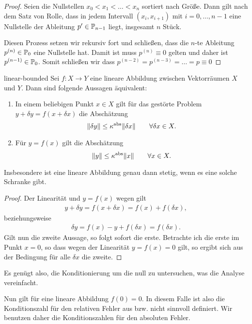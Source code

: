 \begin{proof}
  Seien die Nullstellen $x_0 < x_1 < \dots < x_n$ sortiert nach
  Größe. Dann gilt nach dem Satz von Rolle, dass in jedem Intervall
  $(x_i, x_{i+1})$ mit $i=0,\dots, n-1$ eine Nullstelle der Ableitung
  $p'\in \P_{n-1}$ liegt, insgesamt $n$ Stück.

  Diesen Prozess setzen wir rekursiv fort und schließen, dass die $n$-te
  Ableitung $p^{(n)} \in \P_0$ eine Nullstelle hat. Damit ist muss
  $p^{(n)}\equiv 0$ gelten und daher ist $p^{(n-1)} \in \P_0$. Somit
  schließen wir dass $p^{(n-2)} = p^{(n-3)} = \dots = p \equiv 0$
\end{proof}


\begin{Lemma}{linear-bounded}
  Sei $f\colon X \to Y$ eine lineare Abbildung zwischen Vektorräumen
  $X$ und $Y$. Dann sind folgende Aussagen äquivalent:
  \begin{enumerate}
  \item In einem beliebigen Punkt $x\in X$ gilt für das gestörte Problem
    $y+\delta y = f(x+\delta x)$ die Abschätzung
    \begin{gather}
      \norm{\delta y} \le \kappa^{\text{abs}} \norm{\delta x}
      \qquad\forall \delta x \in X.
    \end{gather}
  \item Für $y = f(x)$ gilt die Abschätzung
    \begin{gather}
      \norm{y} \le \kappa^{\text{abs}} \norm{x}
      \qquad\forall x \in X.
    \end{gather}
  \end{enumerate}
  Insbesondere ist eine lineare Abbildung genau dann stetig, wenn es
  eine solche Schranke gibt.
\end{Lemma}
\begin{proof}
  Der Linearität und $y=f(x)$ wegen gilt
  \begin{gather}
    y + \delta y = f(x+\delta x) = f(x) + f(\delta x),
  \end{gather}
  beziehungsweise
  \begin{gather}
    \delta y = f(x) - y + f(\delta x) = f(\delta x).
  \end{gather}
  Gilt nun die zweite Aussage, so folgt sofort die erste. Betrachte
  ich die erste im Punkt $x=0$, so dass wegen der Linearität
  $y=f(x) = 0$ gilt, so ergibt sich aus der Bedingung \glqq für alle
  $\delta x$\grqq{} die zweite.
\end{proof}

\begin{remark}
  Es genügt also, die Konditionierung um die null zu untersuchen, was
  die Analyse vereinfacht.

  Nun gilt für eine lineare Abbildung $f(0) = 0$. In diesem Falle ist
  also die Konditionszahl für den relativen Fehler aus
  bzw.  nicht sinnvoll definiert. Wir
  benutzen daher die Konditionszahlen für den absoluten Fehler. 
\end{remark}

